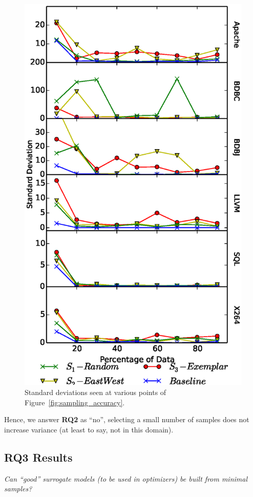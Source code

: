 \documentclass{sig-alternative}
\newcommand{\fig}[1]{Figure~\ref{fig:#1}}
\begin{document}
\begin{figure}[!t]
\includegraphics[width=0.9\linewidth]{Figures/Variance.eps}
\caption{Standard deviations seen at various points of  \fig{sampling_accuracy}.}\label{fig:Variance}
\end{figure}

Hence, we answer {\bf RQ2} as ``no'', selecting a small number of samples does not increase variance (at least to say, not in this domain).

\subsection{RQ3 Results}

 {\em
Can ``good'' surrogate models (to be used in optimizers)
be built from minimal samples?}
\end{document}
